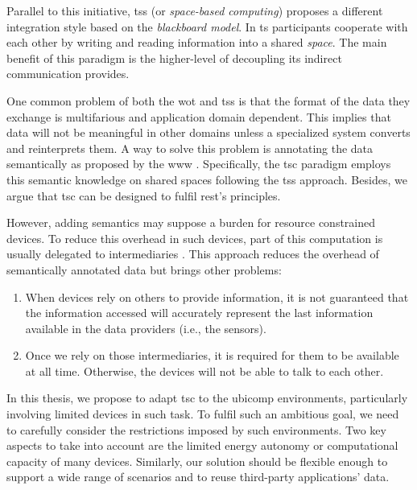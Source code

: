 
Parallel to this initiative, \aclp{ts} (or \emph{space-based computing}) \citep{gelernter_generative_1985} proposes a different integration style based on the \emph{blackboard model}.
In \ac{ts} participants cooperate with each other by writing and reading information into a shared \emph{space}.
The main benefit of this paradigm is the higher-level of decoupling its indirect communication provides. %


\bigskip

One common problem of both the \ac{wot} and \aclp{ts} is that the format of the data they exchange is multifarious and application domain dependent.
This implies that data will not be meaningful in other domains unless a specialized system converts and reinterprets them.
A way to solve this problem is annotating the data semantically as proposed by the \ac{www} \citep{berners-lee_semantic_2001}.
Specifically, the \ac{tsc} paradigm \citep{fensel_triple-space_2004} employs this semantic knowledge on shared spaces following the \aclp{ts} approach.
Besides, we argue that \ac{tsc} can be designed to fulfil \ac{rest}'s principles.


However, adding semantics may suppose a burden for resource constrained devices.
To reduce this overhead in such devices, part of this computation is usually delegated to intermediaries \citep{honkola_smart-m3_2010}. %
This approach reduces the overhead of semantically annotated data but brings other problems:
\begin{enumerate}
 \item When devices rely on others to provide information, it is not guaranteed that the information accessed will accurately represent the last information available in the data providers (i.e., the sensors).
 \item Once we rely on those intermediaries, it is required for them to be available at all time.
	Otherwise, the devices will not be able to talk to each other.
\end{enumerate}


\bigskip


In this thesis, we propose to adapt \ac{tsc} to the \ac{ubicomp} environments, particularly involving limited devices in such task.
To fulfil such an ambitious goal, we need to carefully consider the restrictions imposed by such environments.
Two key aspects to take into account are the limited energy autonomy or computational capacity of many devices.
Similarly, our solution should be flexible enough to support a wide range of scenarios and to reuse third-party applications' data.


